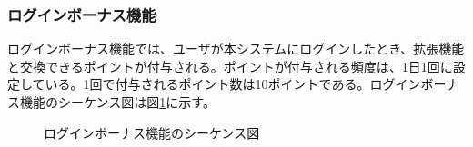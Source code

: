 \documentclass[a4j]{jarticle}
\begin{document}
  \subsubsection{ログインボーナス機能}
  ログインボーナス機能では、ユーザが本システムにログインしたとき、拡張機能と交換できるポイントが付与される。ポイントが付与される頻度は、1日1回に設定している。1回で付与されるポイント数は10ポイントである。ログインボーナス機能のシーケンス図は図\ref{fig:login_login-bonus.png}に示す。
  \begin{figure}[H]
    \centering
    \caption{ログインボーナス機能のシーケンス図}
    \label{fig:login_login-bonus.png}
  \end{figure}
\end{document}
